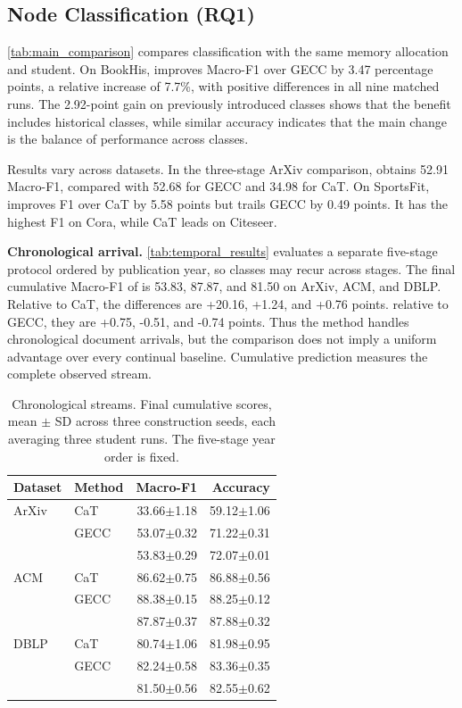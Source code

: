 \subsection{Node Classification (RQ1)}
\label{sec:main_results}

\autoref{tab:main_comparison} compares classification with the same memory allocation and student. On BookHis, \method{} improves Macro-F1 over GECC by 3.47 percentage points, a relative increase of 7.7\%, with positive differences in all nine matched runs. The 2.92-point gain on previously introduced classes shows that the benefit includes historical classes, while similar accuracy indicates that the main change is the balance of performance across classes.

Results vary across datasets. In the three-stage ArXiv comparison,
\method{} obtains 52.91 Macro-F1, compared with 52.68 for GECC and 34.98
for CaT. On SportsFit, \method{} improves F1 over CaT by 5.58 points but
trails GECC by 0.49 points. It has the highest F1 on Cora, while CaT leads on
Citeseer.



\noindent\textbf{Chronological arrival.}
\autoref{tab:temporal_results} evaluates a separate five-stage protocol ordered
by publication year, so classes may recur across stages. The final cumulative
Macro-F1 of \method{} is 53.83, 87.87, and 81.50 on ArXiv, ACM, and DBLP.
Relative to CaT, the differences are +20.16, +1.24, and +0.76 points.
relative to GECC, they are +0.75, -0.51, and -0.74 points. Thus the method
handles chronological document arrivals, but the comparison does not imply a
uniform advantage over every continual baseline. Cumulative prediction
measures the complete observed stream.

\begin{table}[t]
\centering
\footnotesize
\setlength{\tabcolsep}{3pt}
\caption{Chronological streams. Final cumulative scores, mean $\pm$ SD across three construction seeds, each averaging three student runs. The five-stage year order is fixed.}
\label{tab:temporal_results}
\begin{tabular*}{\columnwidth}{@{\extracolsep{\fill}}llrr@{}}
\toprule
Dataset & Method & Macro-F1 & Accuracy\\
\midrule
ArXiv & CaT & 33.66$\pm$1.18 & 59.12$\pm$1.06\\
& GECC & 53.07$\pm$0.32 & 71.22$\pm$0.31\\
& \method{} & 53.83$\pm$0.29 & 72.07$\pm$0.01\\
\midrule
ACM & CaT & 86.62$\pm$0.75 & 86.88$\pm$0.56\\
& GECC & 88.38$\pm$0.15 & 88.25$\pm$0.12\\
& \method{} & 87.87$\pm$0.37 & 87.88$\pm$0.32\\
\midrule
DBLP & CaT & 80.74$\pm$1.06 & 81.98$\pm$0.95\\
& GECC & 82.24$\pm$0.58 & 83.36$\pm$0.35\\
& \method{} & 81.50$\pm$0.56 & 82.55$\pm$0.62\\
\bottomrule
\end{tabular*}
\end{table}
